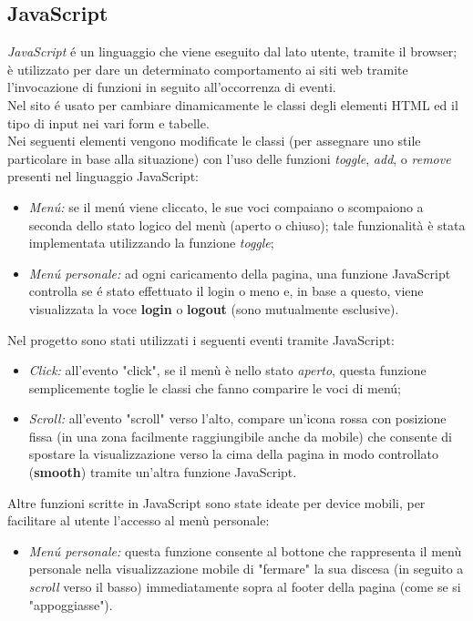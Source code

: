 \documentclass{article}
\begin{document}
\subsection{JavaScript} %
\textit{JavaScript} é un linguaggio che viene eseguito dal lato utente, tramite il browser; è utilizzato per dare un determinato comportamento ai siti web tramite l'invocazione di funzioni in seguito all'occorrenza di eventi.\\
Nel sito é usato per cambiare dinamicamente le classi degli elementi HTML ed il tipo di input nei vari form e tabelle.\\
Nei seguenti elementi vengono modificate le classi (per assegnare uno stile particolare in base alla situazione) con l'uso delle funzioni \textit{toggle}, \textit{add}, o \textit{remove} presenti nel linguaggio JavaScript:
\begin{itemize}
        \item \textit{Menú:} se il menú viene cliccato, le sue voci compaiano o scompaiono a seconda dello stato logico del menù (aperto o chiuso); tale funzionalità è stata implementata utilizzando la funzione \textit{toggle};
        \item \textit{Menú personale:} ad ogni caricamento della pagina, una funzione JavaScript controlla se é stato effettuato il login o meno e, in base a questo, viene visualizzata la voce \textbf{login} o \textbf{logout} (sono mutualmente esclusive).
\end{itemize}
Nel progetto sono stati utilizzati i seguenti eventi tramite JavaScript:
\begin{itemize}
        \item \textit{Click:} all'evento "click", se il menù è nello stato \textit{aperto}, questa funzione semplicemente toglie le classi che fanno comparire le voci di menú;
        \item \textit{Scroll:} all'evento "scroll" verso l'alto, compare un'icona rossa con posizione fissa (in una zona facilmente raggiungibile anche da mobile) che consente di spostare la visualizzazione verso la cima della pagina in modo controllato (\textbf{smooth}) tramite un'altra funzione JavaScript.
\end{itemize}
Altre funzioni scritte in JavaScript sono state ideate per device mobili, per facilitare al utente l'accesso al menù personale:
\begin{itemize}
        \item \textit{Menú personale:} questa funzione consente al bottone che rappresenta il menù personale nella visualizzazione mobile di "fermare" la sua discesa (in seguito a \textit{scroll} verso il basso) immediatamente sopra al footer della pagina (come se si "appoggiasse").
\end{itemize}
\end{document}
